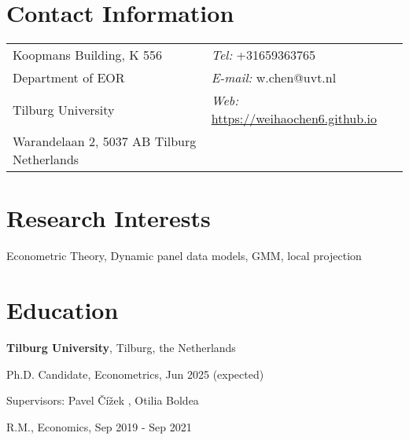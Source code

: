 \documentclass[margin,line]{res}
\newenvironment{list1}{
  \begin{list}{\ding{113}}{%
      \setlength{\itemsep}{0in}
      \setlength{\parsep}{0in} \setlength{\parskip}{0in}
      \setlength{\topsep}{0in} \setlength{\partopsep}{0in} 
      \setlength{\leftmargin}{0.17in}}}{\end{list}}
\begin{document}

\begin{resume}
\section{\sc Contact Information}
\vspace{.05in}
\begin{tabular}{@{}p{2in}p{4in}}
Koopmans Building, K 556     & {\it Tel:}  +31659363765 \\            
Department of EOR   &  {\it E-mail:}  w.chen@uvt.nl\\         
Tilburg University &{\it Web:} \url{https://weihaochen6.github.io} \\       
Warandelaan 2, 5037 AB Tilburg Netherlands  & \\     
\end{tabular}

\section{\sc Research Interests}
Econometric Theory, Dynamic panel data models, GMM, local projection
\section{\sc Education}
{\bf Tilburg University}, Tilburg, the Netherlands\\
\vspace*{-.1in}
\begin{list1}
\item[] Ph.D. Candidate, Econometrics, Jun 2025 (expected) 
\vspace*{.05in}
\item[] Supervisors:  Pavel \v{C}\'{i}\v{z}ek
, Otilia Boldea
%
%
\vspace*{.05in}
\item[] R.M., Economics,  Sep 2019 - Sep 2021
\end{list1}


\end{resume}
\end{document}
